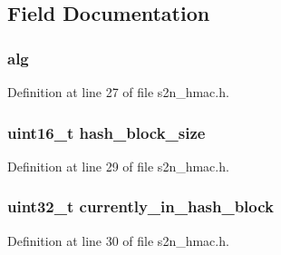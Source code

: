 \subsection{Field Documentation}
\subsubsection[{\texorpdfstring{alg}{alg}}]{ alg}\hypertarget{structs2n__hmac__state_ae2daecd156006e6cf5c5800a7293628c}{}\label{structs2n__hmac__state_ae2daecd156006e6cf5c5800a7293628c}


Definition at line 27 of file s2n\+\_\+hmac.\+h.

\subsubsection[{\texorpdfstring{hash\+\_\+block\+\_\+size}{hash_block_size}}]{\setlength{\rightskip}{0pt plus 5cm}uint16\+\_\+t hash\+\_\+block\+\_\+size}\hypertarget{structs2n__hmac__state_aca61390fa10dd3f3eb4badb02b7fbffe}{}\label{structs2n__hmac__state_aca61390fa10dd3f3eb4badb02b7fbffe}


Definition at line 29 of file s2n\+\_\+hmac.\+h.

\subsubsection[{\texorpdfstring{currently\+\_\+in\+\_\+hash\+\_\+block}{currently_in_hash_block}}]{\setlength{\rightskip}{0pt plus 5cm}uint32\+\_\+t currently\+\_\+in\+\_\+hash\+\_\+block}\hypertarget{structs2n__hmac__state_a492cc04284ac35744b5e60cf027bf54c}{}\label{structs2n__hmac__state_a492cc04284ac35744b5e60cf027bf54c}


Definition at line 30 of file s2n\+\_\+hmac.\+h.


